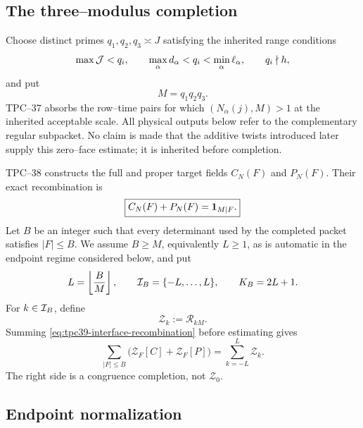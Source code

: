 \subsection{The three--modulus completion}

Choose distinct primes \(q_1,q_2,q_3\asymp J\) satisfying the inherited
range conditions
\begin{equation}
 \max\mathcal J<q_i,
 \qquad
 \max_\alpha d_\alpha<q_i<\min_\alpha\ell_\alpha,
 \qquad q_i\nmid h,
 \label{eq:tpc39-interface-prime-range}
\end{equation}
and put
\begin{equation}
 M=q_1q_2q_3.
 \label{eq:tpc39-interface-M}
\end{equation}
TPC--37 absorbs the row--time pairs for which
\((N_\alpha(j),M)>1\) at the inherited acceptable scale.  All physical
outputs below refer to the complementary regular subpacket.  No claim is
made that the additive twists introduced later supply this zero--face
estimate; it is inherited before completion.

TPC--38 constructs the full and proper target fields \(C_N(F)\) and
\(P_N(F)\).  Their exact recombination is
\begin{equation}
 \boxed{C_N(F)+P_N(F)=\mathbf 1_{M\mid F}.}
 \label{eq:tpc39-interface-recombination}
\end{equation}
Let \(B\) be an integer such that every determinant used by the completed
packet satisfies \(|F|\le B\).  We assume \(B\ge M\), equivalently
\(L\ge1\), as is automatic in the endpoint regime considered below, and put
\begin{equation}
 L=\left\lfloor\frac BM\right\rfloor,
 \qquad
 \mathcal I_B=\{-L,\ldots,L\},
 \qquad
 K_B=2L+1.
 \label{eq:tpc39-interface-alias-ledger}
\end{equation}
For \(k\in\mathcal I_B\), define
\begin{equation}
 \mathscr Z_k:=\mathscr R_{kM}.
 \label{eq:tpc39-interface-Zk}
\end{equation}
Summing \eqref{eq:tpc39-interface-recombination} before estimating gives
\begin{equation}
 \sum_{|F|\le B}
 \bigl(\mathscr Z_F[C]+\mathscr Z_F[P]\bigr)
 =\sum_{k=-L}^{L}\mathscr Z_k.
 \label{eq:tpc39-interface-completed-alias}
\end{equation}
The right side is a congruence completion, not \(\mathscr Z_0\).

\subsection{Endpoint normalization}

